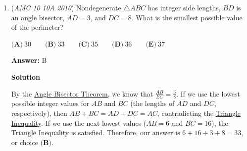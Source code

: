\begin{enumerate}
 Assume Brian is a toad. Then Mike is a frog, and he lies about at least two being toads. This means that none or one of the amphibians is a toad (the opposite of the statement $n\geq2$ is $n<2$, or $n=0, 1$). However, this is absurd because we assumed Brian is a toad, and we know one of Chris and LeRoy is a toad. So our assumption leads to a contradiction.

 Hence Brian must be a frog, and he and Mike are the same species. Mike is also a frog. One of Chris and LeRoy is a frog. There are $3$ frogs in total $\Longrightarrow \boxed{\textbf{(D) } 3}$.

 



\textbf{Solution 3: Casework/Proof by contradiction}

First, we assume that Brian is a toad. Since his statements are truthful, Mike could not be a toad and must be a frog. Since frogs are liars, Brian must be the only toad in the pond, so Chris and Leroy are both frogs. However, they would then be telling the truth about each other, which only toads do. Hence, this case results in a contraction.Hence, Brian is a frog. He is lying, so Mike must also be a frog. Mike's statement is also false, so Chris and Leroy cannot both be toads. As shown in the previous case, them both being frogs is impossible, so one must be a toad and the other a frog. Therefore, there must be a total of 3 frogs.By-Monkey\_King

 


	\item (\textit{AMC 10 10A 2010}) Nondegenerate ${\triangle ABC}$  has integer side lengths, ${\overline{BD}}$ is an angle bisector, $AD = 3$, and $DC=8$. What is the smallest possible value of the perimeter?


 $\textbf{(A)}\ 30 \qquad \textbf{(B)}\ 33 \qquad \textbf{(C)}\ 35 \qquad \textbf{(D)}\ 36 \qquad \textbf{(E)}\ 37$

 \textbf{Answer: }B



\textbf{Solution}

By the \href{https://artofproblemsolving.com/wiki/index.php?title=Angle\_Bisector\_Theorem}{Angle Bisector Theorem}, we know that $\frac{AB}{BC} = \frac{3}{8}$. If we use the lowest possible integer values for $AB$ and $BC$ (the lengths of $AD$ and $DC$, respectively), then $AB + BC = AD + DC = AC$, contradicting the \href{https://artofproblemsolving.com/wiki/index.php?title=Triangle\_Inequality}{Triangle Inequality}. If we use the next lowest values ($AB = 6$ and $BC = 16$), the Triangle Inequality is satisfied. Therefore, our answer is $6 + 16 + 3 + 8 = \boxed{33}$, or choice $\textbf{(B)}$.


\end{enumerate}
